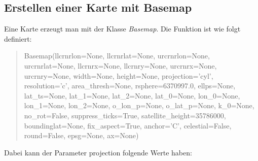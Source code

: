 \subsection{Erstellen einer Karte mit Basemap}
\label{sec:erstellen}
Eine Karte erzeugt man mit der Klasse \emph{Basemap}. Die Funktion ist wie folgt definiert:
\begin{verse}
\textsf{ Basemap(llcrnrlon=None, llcrnrlat=None, urcrnrlon=None, urcrnrlat=None, llcrnrx=None, llcrnry=None, urcrnrx=None, urcrnry=None, width=None, height=None, projection='cyl', resolution='c', area\_thresh=None, rsphere=6370997.0, ellps=None, lat\_ts=None, lat\_1=None, lat\_2=None, lat\_0=None, lon\_0=None, lon\_1=None, lon\_2=None, o\_lon\_p=None, o\_lat\_p=None, k\_0=None, no\_rot=False, suppress\_ticks=True, satellite\_height=35786000, boundinglat=None, fix\_aspect=True, anchor='C', celestial=False, round=False, epsg=None, ax=None)
}\end{verse}
Dabei kann der Parameter \textsf{projection} folgende Werte haben:
\newline
